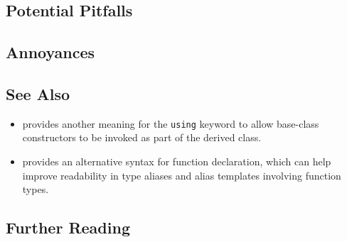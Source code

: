 \subsection[Potential Pitfalls]{Potential Pitfalls}\label{potential-pitfalls}

\hspace*{\fill}

\subsection[Annoyances]{Annoyances}\label{annoyances}

\hspace*{\fill}

\subsection[See Also]{See Also}\label{see-also}

\begin{itemize}
\item{provides another meaning for the \lstinline!using! keyword to allow base-class constructors to be invoked as part of the derived class.}
\item{provides an alternative syntax for function declaration, which can help improve readability in type aliases and alias templates involving function types.}
\end{itemize}

\subsection[Further Reading]{Further Reading}\label{further-reading}





